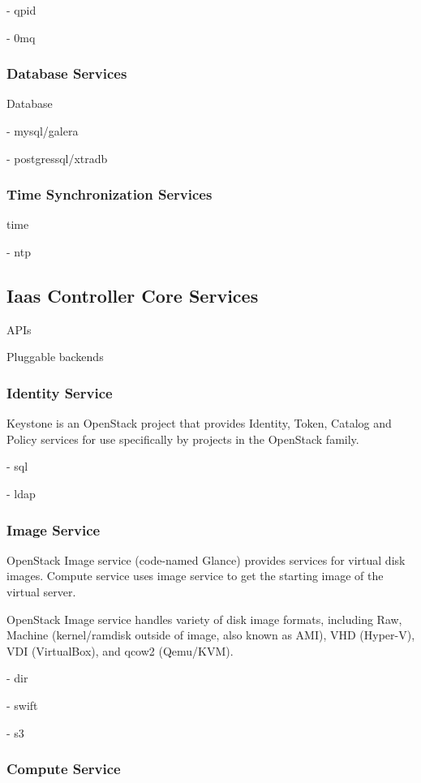 - qpid

- 0mq

\subsubsection{Database Services}

Database

- mysql/galera

- postgressql/xtradb

\subsubsection{Time Synchronization Services}

time

- ntp

\subsection{Iaas Controller Core Services}

APIs

Pluggable backends

\subsubsection{Identity Service}

Keystone is an OpenStack project that provides Identity, Token, Catalog and Policy services for use specifically by projects in the OpenStack family.

- sql	

- ldap

\subsubsection{Image Service}

OpenStack Image service (code-named Glance) provides services for virtual disk images. Compute service uses image service to get the starting image of the virtual server.

OpenStack Image service handles variety of disk image formats, including Raw, Machine (kernel/ramdisk outside of image, also known as AMI), VHD (Hyper-V), VDI (VirtualBox), and qcow2 (Qemu/KVM).

- dir

- swift

- s3

\subsubsection{Compute Service}

